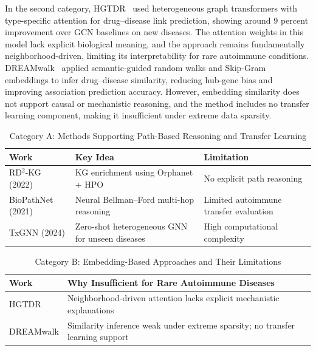 \documentclass[conference]{IEEEtran}
\begin{document}
In the second category, HGTDR~\cite{hgtdr} used heterogeneous graph transformers with type-specific attention for drug--disease link prediction, showing around 9 percent improvement over GCN baselines on new diseases. The attention weights in this model lack explicit biological meaning, and the approach remains fundamentally neighborhood-driven, limiting its interpretability for rare autoimmune conditions. DREAMwalk~\cite{dreamwalk} applied semantic-guided random walks and Skip-Gram embeddings to infer drug--disease similarity, reducing hub-gene bias and improving association prediction accuracy. However, embedding similarity does not support causal or mechanistic reasoning, and the method includes no transfer learning component, making it insufficient under extreme data sparsity.

\begin{table}[!t]
\caption{Category A: Methods Supporting Path-Based Reasoning and Transfer Learning}
\centering
\footnotesize
\renewcommand{\arraystretch}{1.4}
\begin{tabular}{p{1.8cm}p{2.8cm}p{2.6cm}}
\toprule
\textbf{Work} & \textbf{Key Idea} & \textbf{Limitation} \\
\midrule
RD$^2$-KG (2022) & KG enrichment using Orphanet + HPO & No explicit path reasoning \\[3pt]
BioPathNet (2021) & Neural Bellman--Ford multi-hop reasoning & Limited autoimmune transfer evaluation \\[3pt]
TxGNN (2024) & Zero-shot heterogeneous GNN for unseen diseases & High computational complexity \\
\bottomrule
\end{tabular}
\end{table}

\begin{table}[!t]
\caption{Category B: Embedding-Based Approaches and Their Limitations}
\centering
\footnotesize
\renewcommand{\arraystretch}{1.4}
\begin{tabular}{p{1.8cm}p{5.5cm}}
\toprule
\textbf{Work} & \textbf{Why Insufficient for Rare Autoimmune Diseases} \\
\midrule
HGTDR & Neighborhood-driven attention lacks explicit mechanistic explanations \\[3pt]
DREAMwalk & Similarity inference weak under extreme sparsity; no transfer learning support \\
\bottomrule
\end{tabular}
\end{table}
\end{document}
